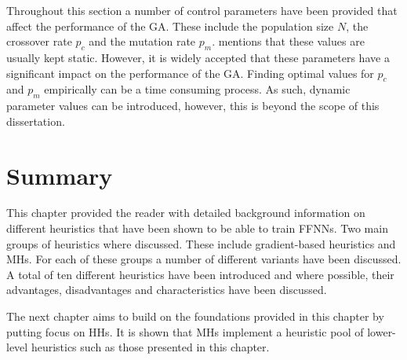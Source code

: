 Throughout this section a number of control parameters have been provided that affect the performance of the \ac{GA}. These include the population size $N$, the crossover rate $p_{c}$ and the mutation rate $p_{m}$. \citeauthor{ref:engelbrecht:2007}\cite{ref:engelbrecht:2007} mentions that these values are usually kept static. However, it is widely accepted that these parameters have a significant impact on the performance of the \ac{GA}.  Finding optimal values for $p_{c}$ and  $p_{m}$ empirically can be a time consuming process. As such, dynamic parameter values can be introduced, however, this is beyond the scope of this dissertation.


\section{Summary}
\label{sec:heuristics:summary}

This chapter provided the reader with detailed background information on different heuristics that have been shown to be able to train \acp{FFNN}. Two main groups of heuristics where discussed. These include gradient-based heuristics and \aclp{MH}. For each of these groups a number of different variants have been discussed. A total of ten different heuristics have been introduced and where possible, their advantages, disadvantages and characteristics have been discussed. 

The next chapter aims to build on the foundations provided in this chapter by putting focus on \acp{HH}. It is shown that \acp{MH} implement a heuristic pool of lower-level heuristics such as those presented in this chapter.










